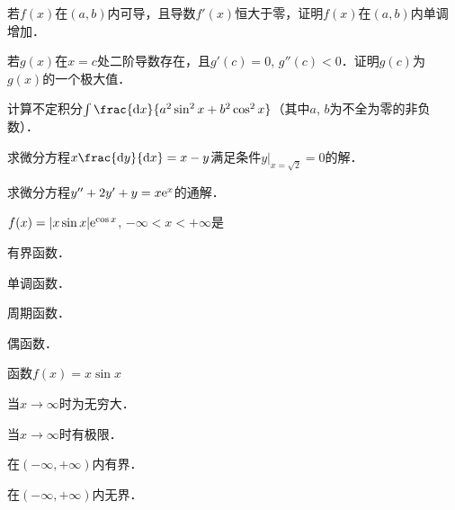 \documentclass[plain,noanswer,medmath]{../../template/jnuexam}
\begin{document}


\begin{problem}
若$f(x)$在$(a,b)$内可导，且导数$f'(x)$恒大于零，证明$f(x)$在$(a,b)$内单调增加．
\end{problem}


\begin{problem}
若$g(x)$在$x = c$处二阶导数存在，且$g'(c) = 0$, $g''(c) < 0$．证明$g(c)$为$g(x)$的一个极大值．
\end{problem}



\begin{problem}
计算不定积分$\int \frac{\dx}{a^2\sin^2 x + b^2\cos^2 x}$（其中$a$, $b$为不全为零的非负数）．
\end{problem}




\begin{problem}[points=7]
求微分方程$x\frac{\dy}{\dx} = x - y$满足条件$y\big|_{x=\sqrt{2}} = 0$的解．
\end{problem}


\begin{problem}[points=8]
求微分方程$y'' + 2y' + y = x\mathrm{e}^x$的通解．
\end{problem}




\begin{problem}
$f(x) = |x\sin x|\mathrm{e}^{\cos x}$, $-\infty < x < +\infty$是\pickout{}
\begin{abcd}
\item 有界函数．
\item 单调函数．
\item 周期函数．
\item 偶函数．
\end{abcd}
\end{problem}


\begin{problem}
函数$f(x) = x\sin x$\pickout{}
\begin{abcd}
\item 当$x \to \infty$时为无穷大．
\item 当$x \to \infty$时有极限．
\item 在$(-\infty, +\infty)$内有界．
\item 在$(-\infty, +\infty)$内无界．
\end{abcd}
\end{problem}
\end{document}
